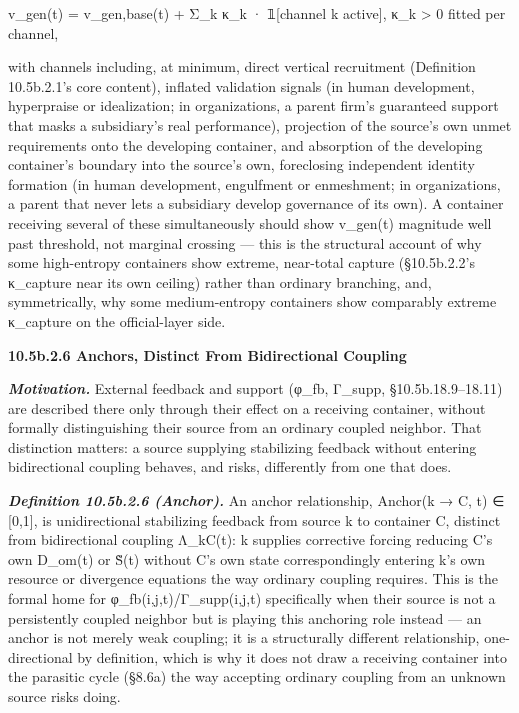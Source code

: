 \documentclass[
]{article}
\begin{document}
v\_gen(t) = v\_gen,base(t) + Σ\_k κ\_k · 𝟙{[}channel k active{]}, κ\_k
\textgreater{} 0 fitted per channel,

with channels including, at minimum, direct vertical recruitment
(Definition 10.5b.2.1's core content), inflated validation signals (in
human development, hyperpraise or idealization; in organizations, a
parent firm's guaranteed support that masks a subsidiary's real
performance), projection of the source's own unmet requirements onto the
developing container, and absorption of the developing container's
boundary into the source's own, foreclosing independent identity
formation (in human development, engulfment or enmeshment; in
organizations, a parent that never lets a subsidiary develop governance
of its own). A container receiving several of these simultaneously
should show v\_gen(t) magnitude well past threshold, not marginal
crossing --- this is the structural account of why some high-entropy
containers show extreme, near-total capture (§10.5b.2.2's κ\_capture
near its own ceiling) rather than ordinary branching, and,
symmetrically, why some medium-entropy containers show comparably
extreme κ\_capture on the official-layer side.

\textbf{10.5b.2.6 Anchors, Distinct From Bidirectional Coupling}

\emph{\textbf{Motivation.}} External feedback and support (φ\_fb,
Γ\_supp, §10.5b.18.9--18.11) are described there only through their
effect on a receiving container, without formally distinguishing their
source from an ordinary coupled neighbor. That distinction matters: a
source supplying stabilizing feedback without entering bidirectional
coupling behaves, and risks, differently from one that does.

\emph{\textbf{Definition 10.5b.2.6 (Anchor).}} An anchor relationship,
Anchor(k → C, t) ∈ {[}0,1{]}, is unidirectional stabilizing feedback
from source k to container C, distinct from bidirectional coupling
Λ\_kC(t): k supplies corrective forcing reducing C's own D\_om(t) or
S̃(t) without C's own state correspondingly entering k's own resource or
divergence equations the way ordinary coupling requires. This is the
formal home for φ\_fb(i,j,t)/Γ\_supp(i,j,t) specifically when their
source is not a persistently coupled neighbor but is playing this
anchoring role instead --- an anchor is not merely weak coupling; it is
a structurally different relationship, one-directional by definition,
which is why it does not draw a receiving container into the parasitic
cycle (§8.6a) the way accepting ordinary coupling from an unknown source
risks doing.
\end{document}
